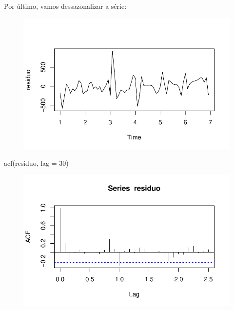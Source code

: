 \documentclass[
  letterpaper,
  DIV=11,
  numbers=noendperiod]{scrreprt}
\newenvironment{Shaded}{\begin{snugshade}}{\end{snugshade}}
\newcommand{\AttributeTok}[1]{\textcolor[rgb]{0.40,0.45,0.13}{#1}}
\newcommand{\DecValTok}[1]{\textcolor[rgb]{0.68,0.00,0.00}{#1}}
\newcommand{\FunctionTok}[1]{\textcolor[rgb]{0.28,0.35,0.67}{#1}}
\newcommand{\NormalTok}[1]{\textcolor[rgb]{0.00,0.23,0.31}{#1}}
\newcommand{\OtherTok}[1]{\textcolor[rgb]{0.00,0.23,0.31}{#1}}
\newcommand{\SpecialCharTok}[1]{\textcolor[rgb]{0.37,0.37,0.37}{#1}}
\begin{document}
Por último, vamos dessazonalizar a série:

\begin{Shaded}
\end{Shaded}

\begin{figure}[H]

{\centering \includegraphics{ferramentas_files/figure-pdf/unnamed-chunk-22-1.pdf}

}

\end{figure}

\begin{Shaded}
\begin{Highlighting}[]
\FunctionTok{acf}\NormalTok{(residuo, }\AttributeTok{lag =} \DecValTok{30}\NormalTok{)}
\end{Highlighting}
\end{Shaded}

\begin{figure}[H]

{\centering \includegraphics{ferramentas_files/figure-pdf/unnamed-chunk-22-2.pdf}

}

\end{figure}
\end{document}

